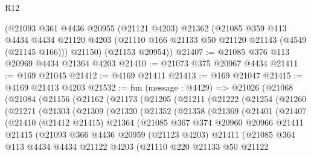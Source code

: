 \begin{lexlean}{R12}
\begin{coremodule}
    (@21093
      @361
      @4436
      @20955
      (@21121 @4203)
      @21362
      (@21085
        @359
        @113
        @4434
        @4434
        @21120
        @4203
        (@21110 @166 @21133 @50 @21120 @21143 (@4549 (@21145 @166)))
        @21150)
      (@21153 @20954))
@21407 := @21085 @376 @113 @20969 @4434 @21364 @4203
@21410 := @21073 @375 @20967 @4434
@21411 := @169 @21045
@21412 := @4169 @21411
@21413 := @169 @21047
@21415 := @4169 @21413 @4203
@21532 := fun (message : @4429) =>
  @21026
    (@21068
      (@21084
        (@21156
          (@21162
            (@21173
              (@21205
                (@21211
                  (@21222
                    (@21254
                      (@21260
                        (@21271
                          (@21303
                            (@21309
                              (@21320
                                (@21352
                                  (@21358
                                    (@21369
                                      (@21401
                                        (@21407
                                          (@21410
                                            (@21412 @21415)
                                            @21364
                                            (@21085
                                              @367
                                              @374
                                              @20960
                                              @20966
                                              @21411
                                              @21415
                                              (@21093
                                                @366
                                                @4436
                                                @20959
                                                (@21123 @4203)
                                                @21411
                                                (@21085
                                                  @364
                                                  @113
                                                  @4434
                                                  @4434
                                                  @21122
                                                  @4203
                                                  (@21110
                                                    @220
                                                    @21133
                                                    @50
                                                    @21122

\end{coremodule}
\end{lexlean}
